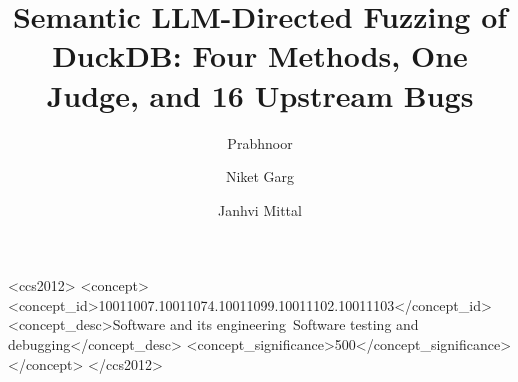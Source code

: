 \documentclass[acmsmall,screen]{acmart}
\begin{document}
\title[LLM-Directed Fuzzing of DuckDB]{Semantic LLM-Directed Fuzzing of DuckDB: Four Methods, One Judge, and 16 Upstream Bugs}

\author{Prabhnoor}
\author{Niket Garg}
\author{Janhvi Mittal}

\begin{abstract}

\end{abstract}

\begin{CCSXML}
<ccs2012>
  <concept>
    <concept_id>10011007.10011074.10011099.10011102.10011103</concept_id>
    <concept_desc>Software and its engineering~Software testing and debugging</concept_desc>
    <concept_significance>500</concept_significance>
  </concept>
</ccs2012>
\end{CCSXML}


\maketitle














\end{document}
